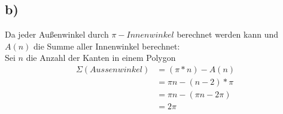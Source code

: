 \documentclass[11pt,a4paper,parskip=quarter ]{article}
\begin{document}
\subsection*{b)}
	Da jeder Außenwinkel durch $\pi-Innenwinkel$ berechnet werden kann und $A(n)$ die Summe aller Innenwinkel berechnet:	\\
	
	Sei $n$ die Anzahl der Kanten in einem Polygon
	\begin{align*}
		\Sigma(Aussenwinkel)&=(\pi\ast n)-A(n) 		\\
							&=\pi n - (n-2)\ast\pi 	\\
							&=\pi n-(\pi n -2\pi) 	\\
							&=2\pi					\\
	\end{align*}
	
	
%	
%	
\end{document}
